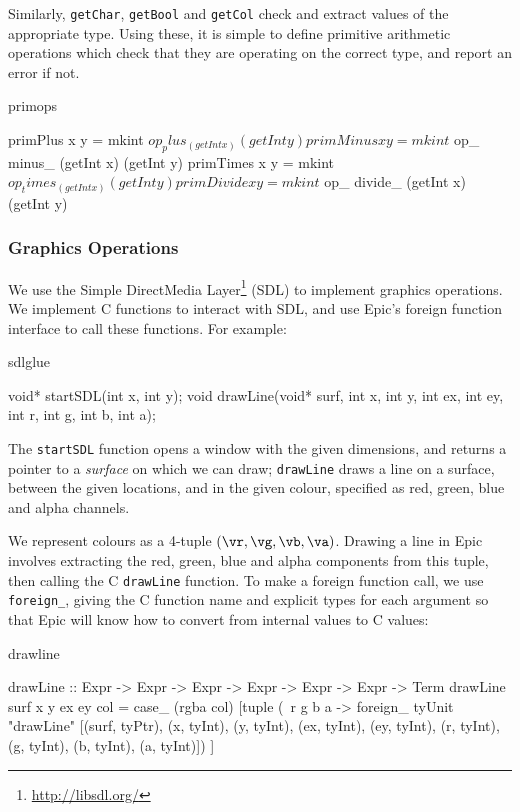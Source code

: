 \noindent
Similarly, \texttt{getChar}, \texttt{getBool} and \texttt{getCol}
check and extract values of the appropriate type.
Using these, it is simple to define primitive arithmetic operations
which check that they are operating on the correct type, and report an
error if not.

\begin{SaveVerbatim}{primops}

primPlus   x y = mkint $ op_ plus_   (getInt x) (getInt y)
primMinus  x y = mkint $ op_ minus_  (getInt x) (getInt y)
primTimes  x y = mkint $ op_ times_  (getInt x) (getInt y)
primDivide x y = mkint $ op_ divide_ (getInt x) (getInt y)
\end{SaveVerbatim}

\subsubsection{Graphics Operations}

We use the Simple DirectMedia Layer\footnote{\url{http://libsdl.org/}}
(SDL) to implement graphics operations. We implement C functions to
interact with SDL, and use Epic's foreign function interface to
call these functions. For example:

\begin{SaveVerbatim}{sdlglue}

void* startSDL(int x, int y);
void  drawLine(void* surf, int x, int y, int ex, int ey,
                           int r, int g, int b, int a);

\end{SaveVerbatim}

\noindent
The \texttt{startSDL} function opens a window with the given
dimensions, and returns a pointer to a \emph{surface} on which we can
draw; \texttt{drawLine} draws a line on a surface, between the given
locations, and in the given colour, specified as red, green, blue and
alpha channels.

We represent colours as a 4-tuple $(\vr,\vg,\vb,\va)$.  Drawing a line
in Epic involves extracting the red, green, blue and alpha components
from this tuple, then calling the C \texttt{drawLine} function. To
make a foreign function call, we use \texttt{foreign\_}, giving the C
function name and explicit types for each argument so that Epic
will know how to convert from internal values to C values:

\begin{SaveVerbatim}{drawline}

drawLine :: Expr -> Expr -> Expr -> Expr -> Expr -> Expr -> Term
drawLine surf x y ex ey col
    = case_ (rgba col)
        [tuple (\ r g b a ->
           foreign_ tyUnit "drawLine" 
             [(surf, tyPtr),
              (x, tyInt), (y, tyInt), (ex, tyInt), (ey, tyInt),
              (r, tyInt), (g, tyInt), (b, tyInt), (a, tyInt)]) ]

\end{SaveVerbatim}

